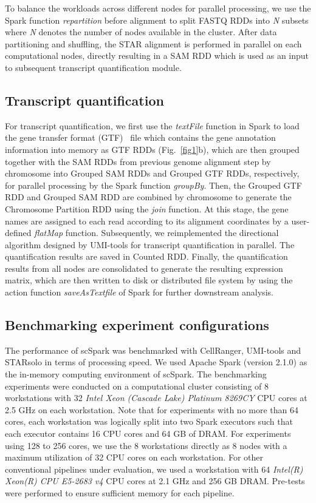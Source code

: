 \documentclass[conference]{IEEEtran}
\begin{document}
To balance the workloads across different nodes for parallel processing, we use the Spark function \textit{repartition} before alignment to split FASTQ RDDs into \textit{N} subsets where \textit{N} denotes the number of nodes available in the cluster.
After data partitioning and shuffling, the STAR alignment is performed in parallel on each computational nodes, directly resulting in a SAM RDD which is used as an input to subsequent transcript quantification module.

\subsection{Transcript quantification}
For transcript quantification, we first use the \textit{textFile} function in Spark to load the gene transfer format (GTF)~\cite{breese2013ngsutils} file which contains the gene annotation information into memory as GTF RDDs (Fig.~\ref{fig1}b), which are then grouped together with the SAM RDDs from previous genome alignment step by chromosome into Grouped SAM RDDs and Grouped GTF RDDs, respectively, for parallel processing by the Spark function \textit{groupBy}. 
Then, the Grouped GTF RDD and Grouped SAM RDD are combined by chromosome to generate the Chromosome Partition RDD using the \textit{join} function.
At this stage, the gene names are assigned to each read according to its alignment coordinates by a user-defined \textit{flatMap} function. 
Subsequently, we reimplemented the directional algorithm designed by UMI-tools for transcript quantification in parallel. The quantification results are saved in Counted RDD.
Finally, the quantification results from all nodes are consolidated to generate the resulting expression matrix, which are then written to disk or distributed file system by using the action function \textit{saveAsTextfile} of Spark for further downstream analysis. 

\subsection{Benchmarking experiment configurations}
The performance of scSpark was benchmarked with CellRanger, UMI-tools and STARsolo in terms of processing speed. 
We used Apache Spark (version 2.1.0) as the in-memory computing environment of scSpark.
The benchmarking experiments were conducted on a computational cluster consisting of 8 workstations with 32 \textit{Intel Xeon (Cascade Lake) Platinum 8269CY} CPU cores at 2.5 GHz on each workstation. 
Note that for experiments with no more than 64 cores, each workstation was logically split into two Spark executors such that each executor contains 16 CPU cores and 64 GB of DRAM. 
For experiments using 128 to 256 cores, we use the 8 workstations directly as 8 nodes with a maximum utilization of 32 CPU cores on each workstation. 
For other conventional pipelines under evaluation, we used a workstation with 64 \textit{Intel(R) Xeon(R) CPU E5-2683 v4} CPU cores at 2.1 GHz and 256 GB DRAM. Pre-tests were performed to ensure sufficient memory for each pipeline.
\end{document}
